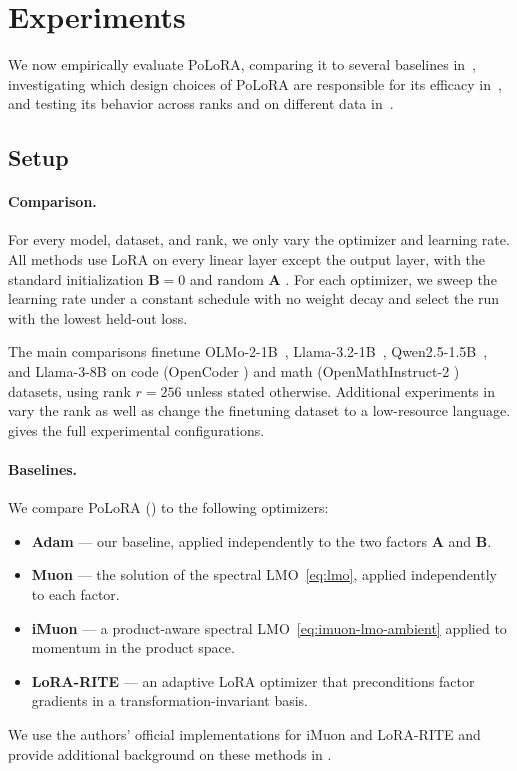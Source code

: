 \documentclass[11pt]{article}
\newcommand{\mat}[1]{\bm{#1}}
\newcommand{\methodname}{PoLoRA\xspace}
\begin{document}
\section{Experiments}
\label{sec:exp}

We now empirically evaluate \methodname{}, comparing it to several baselines in~, investigating which design choices of \methodname{} are responsible for its efficacy in~, and testing its behavior across ranks and on different data in~.

\subsection{Setup}
\label{sec:exp-setup}

\paragraph{Comparison.}
For every model, dataset, and rank, we only vary the optimizer and learning rate. All methods use LoRA on every linear layer except the output layer, with the standard initialization $\mat{B}=0$ and random $\mat{A}$ \cite{lora}. For each optimizer, we sweep the learning rate under a constant schedule with no weight decay and select the run with the lowest held-out loss.

The main comparisons finetune OLMo-2-1B~\cite{olmo2}, Llama-3.2-1B~\cite{llama3}, Qwen2.5-1.5B~\cite{qwen25}, and Llama-3-8B on code (OpenCoder \cite{opencoder}) and math (OpenMathInstruct-2 \cite{openmathinstruct2}) datasets, using rank $r=256$ unless stated otherwise. Additional experiments in  vary the rank as well as change the finetuning dataset to a low-resource language.  gives the full experimental configurations.

\paragraph{Baselines.} We compare \methodname{} () to the following optimizers:
\begin{itemize}[leftmargin=1.5em,itemsep=1pt,topsep=2pt]
  \item \textbf{Adam} \cite{adam} --- our baseline, applied independently to the two factors $\mat{A}$ and $\mat{B}$.
  \item \textbf{Muon} \cite{muon} --- the solution of the spectral LMO~\eqref{eq:lmo}, applied independently to each factor.
  \item \textbf{iMuon} \cite{imuon} --- a product-aware spectral LMO~\eqref{eq:imuon-lmo-ambient} applied to momentum in the product space.
  \item \textbf{LoRA-RITE} \cite{lorarite} --- an adaptive LoRA optimizer that preconditions factor gradients in a transformation-invariant basis.
\end{itemize}
We use the authors' official implementations for iMuon and LoRA-RITE and provide additional background on these methods in . 
\end{document}
